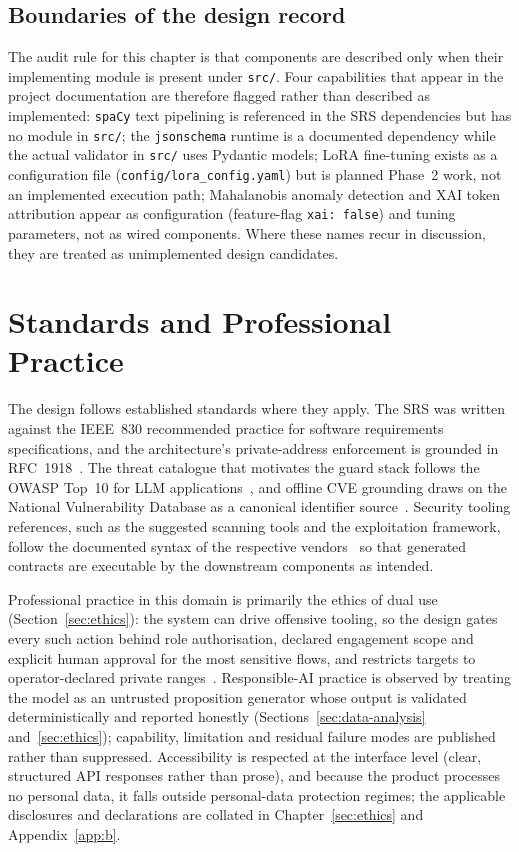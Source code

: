 \subsection*{Boundaries of the design record}

The audit rule for this chapter is that components are described only when
their implementing module is present under \texttt{src/}. Four capabilities that
appear in the project documentation are therefore flagged rather than
described as implemented: \texttt{spaCy} text pipelining is referenced in the
SRS dependencies but has no module in \texttt{src/}; the \texttt{jsonschema}
runtime is a documented dependency while the actual validator in
\texttt{src/} uses Pydantic models; LoRA fine-tuning exists as a configuration
file (\texttt{config/lora\_config.yaml}) but is planned Phase~2 work, not an
implemented execution path; Mahalanobis anomaly detection and XAI token
attribution appear as configuration (feature-flag \texttt{xai: false}) and
tuning parameters, not as wired components. Where these names recur in
discussion, they are treated as unimplemented design candidates.


\section{Standards and Professional Practice}\label{sec:standards}

The design follows established standards where they apply. The SRS was written
against the IEEE~830 recommended practice for software requirements
specifications, and the architecture's private-address enforcement is grounded
in RFC~1918~\cite{rfc1918}. The threat catalogue that motivates the guard
stack follows the OWASP Top~10 for LLM applications~\cite{owasp2025}, and
offline CVE grounding draws on the National Vulnerability Database as a
canonical identifier source~\cite{nistnvd}. Security tooling references, such
as the suggested scanning tools and the exploitation framework, follow the
documented syntax of the respective vendors~\cite{lyon2009nmap,metasploit} so
that generated contracts are executable by the downstream components as
intended.

Professional practice in this domain is primarily the ethics of dual use
(Section~\ref{sec:ethics}): the system can drive offensive tooling, so the
design gates every such action behind role authorisation, declared engagement
scope and explicit human approval for the most sensitive flows, and restricts
targets to operator-declared private ranges~\cite{rfc1918}. Responsible-AI
practice is observed by treating the model as an untrusted proposition
generator whose output is validated deterministically and reported honestly
(Sections~\ref{sec:data-analysis} and~\ref{sec:ethics}); capability, limitation
and residual failure modes are published rather than suppressed. Accessibility
is respected at the interface level (clear, structured API responses rather
than prose), and because the product processes no personal data, it falls
outside personal-data protection regimes; the applicable disclosures and
declarations are collated in Chapter~\ref{sec:ethics} and
Appendix~\ref{app:b}.